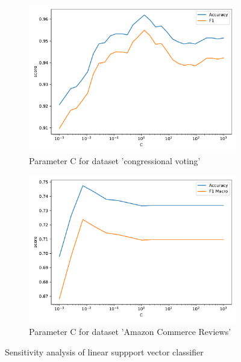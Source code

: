 \documentclass[a4paper,10pt]{article}
\begin{document}
\begin{figure}[h!]
    \captionsetup{justification=centering}
    \begin{subfigure}[b]{0.45\textwidth}
        \includegraphics[width=\textwidth]{congress/plots/LinearSVC_C_sensitivity_new.pdf}
        \caption{Parameter \textsf{C} for dataset 'congressional voting'}
    \end{subfigure}
    \hfill
    \begin{subfigure}[b]{0.45\textwidth}
        \includegraphics[width=\textwidth]{amazon/plots/LinearSVC_C_sensitivity.pdf}
        \caption{Parameter \textsf{C} for dataset 'Amazon Commerce Reviews'}
    \end{subfigure}
    \caption{Sensitivity analysis of linear suppport vector classifier}
    \label{fig: sensitivity lsvc}
\end{figure}
\end{document}
